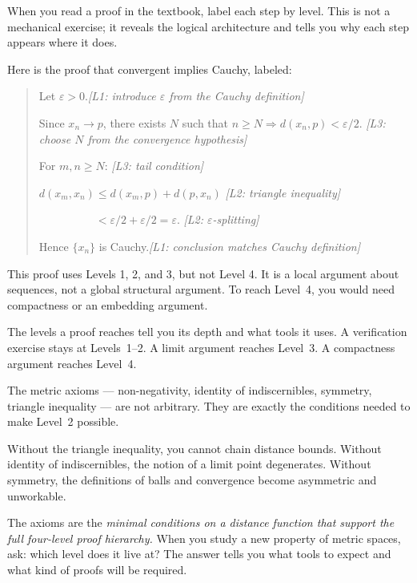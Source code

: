\begin{remark}
When you read a proof in the textbook, label each step by level.
This is not a mechanical exercise; it reveals the logical architecture
and tells you why each step appears where it does.

Here is the proof that convergent implies Cauchy, labeled:

\begin{quote}
Let $\varepsilon > 0$.\hfill \textit{[L1: introduce $\varepsilon$ from the Cauchy definition]}

Since $x_n \to p$, there exists $N$ such that $n \geq N \Rightarrow d(x_n,p) < \varepsilon/2$.
\hfill \textit{[L3: choose $N$ from the convergence hypothesis]}

For $m, n \geq N$:
\hfill \textit{[L3: tail condition]}

$d(x_m, x_n) \leq d(x_m, p) + d(p, x_n)$
\hfill \textit{[L2: triangle inequality]}

$\phantom{d(x_m, x_n)} < \varepsilon/2 + \varepsilon/2 = \varepsilon$.\hfill
\textit{[L2: $\varepsilon$-splitting]}

Hence $\{x_n\}$ is Cauchy.\hfill \textit{[L1: conclusion matches Cauchy definition]}
\end{quote}

This proof uses Levels 1, 2, and 3, but not Level 4. It is a local
argument about sequences, not a global structural argument. To reach
Level~4, you would need compactness or an embedding argument.

The levels a proof reaches tell you its depth and what tools it uses.
A verification exercise stays at Levels~1--2. A limit argument reaches
Level~3. A compactness argument reaches Level~4.
\end{remark}

\begin{remark}
The metric axioms --- non-negativity, identity of indiscernibles,
symmetry, triangle inequality --- are not arbitrary. They are exactly
the conditions needed to make Level~2 possible.

Without the triangle inequality, you cannot chain distance bounds.
Without identity of indiscernibles, the notion of a limit point
degenerates. Without symmetry, the definitions of balls and convergence
become asymmetric and unworkable.

The axioms are the \emph{minimal conditions on a distance function
that support the full four-level proof hierarchy.} When you study a
new property of metric spaces, ask: which level does it live at?
The answer tells you what tools to expect and what kind of proofs
will be required.
\end{remark}
